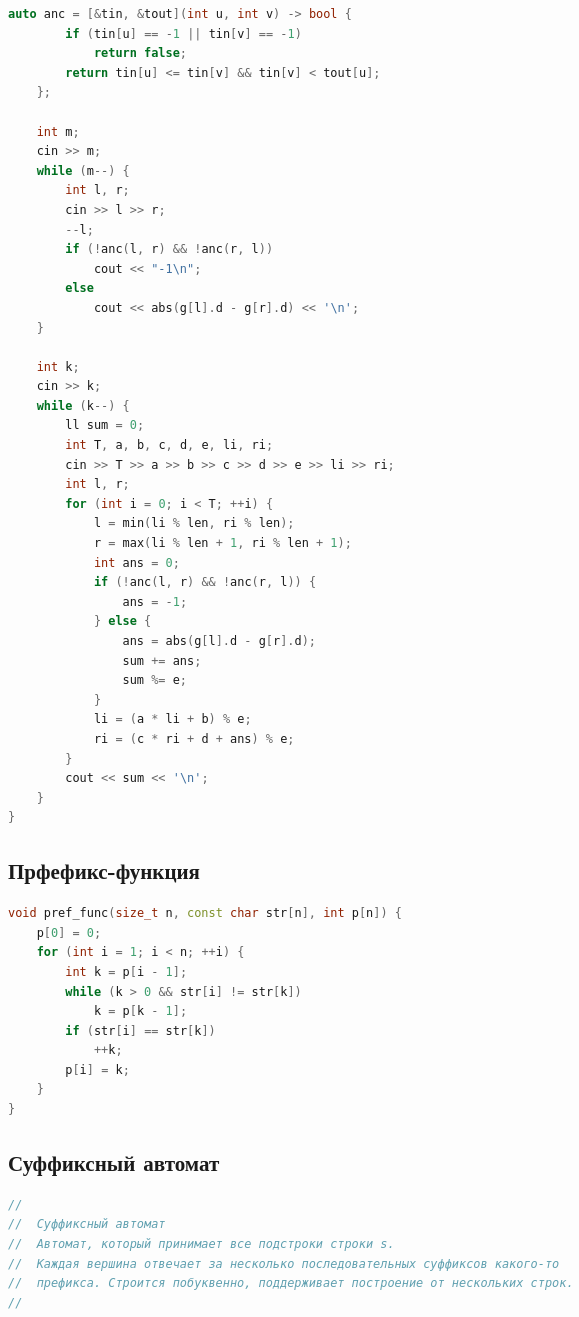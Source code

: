 \documentclass[10pt,a4paper,landscape,twosided]{extarticle}
\begin{document}
\begin{multicols}{3}
\begin{lstlisting}[language=C++]
    auto anc = [&tin, &tout](int u, int v) -> bool {
        if (tin[u] == -1 || tin[v] == -1)
            return false;
        return tin[u] <= tin[v] && tin[v] < tout[u];
    };

    int m;
    cin >> m;
    while (m--) {
        int l, r;
        cin >> l >> r;
        --l;
        if (!anc(l, r) && !anc(r, l))
            cout << "-1\n";
        else
            cout << abs(g[l].d - g[r].d) << '\n';
    }

    int k;
    cin >> k;
    while (k--) {
        ll sum = 0;
        int T, a, b, c, d, e, li, ri;
        cin >> T >> a >> b >> c >> d >> e >> li >> ri;
        int l, r;
        for (int i = 0; i < T; ++i) {
            l = min(li % len, ri % len);
            r = max(li % len + 1, ri % len + 1);
            int ans = 0;
            if (!anc(l, r) && !anc(r, l)) {
                ans = -1;
            } else {
                ans = abs(g[l].d - g[r].d);
                sum += ans;
                sum %= e;
            }
            li = (a * li + b) % e;
            ri = (c * ri + d + ans) % e;
        }
        cout << sum << '\n';
    }
}
\end{lstlisting}

\subsection{Прфефикс-функция}
\begin{lstlisting}[language=C++]
void pref_func(size_t n, const char str[n], int p[n]) {
    p[0] = 0;
    for (int i = 1; i < n; ++i) {
        int k = p[i - 1];
        while (k > 0 && str[i] != str[k])
            k = p[k - 1];
        if (str[i] == str[k])
            ++k;
        p[i] = k;
    }
}
\end{lstlisting}

\subsection{Суффиксный автомат}
\begin{lstlisting}[language=C++]
//
//  Суффиксный автомат
//  Автомат, который принимает все подстроки строки s.
//  Каждая вершина отвечает за несколько последовательных суффиксов какого-то
//  префикса. Строится побуквенно, поддерживает построение от нескольких строк.
//


\end{lstlisting}
\end{multicols}
\end{document}
